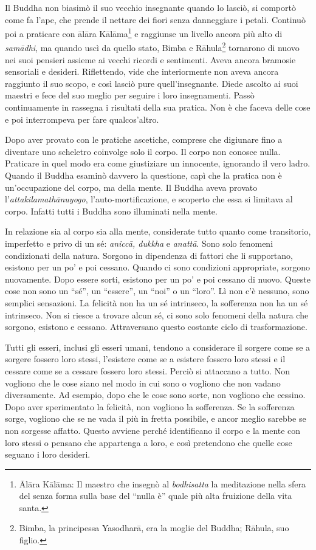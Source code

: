 Il Buddha non biasimò il suo vecchio insegnante quando lo lasciò, si
comportò come fa l'ape, che prende il nettare dei fiori senza
danneggiare i petali. Continuò poi a praticare con ālāra
Kālāma\footnote{Ālāra Kālāma: Il maestro che insegnò al
  \emph{bodhisatta} la meditazione nella sfera del senza forma sulla
  base del ``nulla è'' quale più alta fruizione della vita santa.} e
raggiunse un livello ancora più alto di \emph{samādhi}, ma quando uscì
da quello stato, Bimba e Rāhula\footnote{Bimba, la principessa
  Yasodharā, era la moglie del Buddha; Rāhula, suo figlio.} tornarono di
nuovo nei suoi pensieri assieme ai vecchi ricordi e sentimenti. Aveva
ancora bramosie sensoriali e desideri. Riflettendo, vide che
interiormente non aveva ancora raggiunto il suo scopo, e così lasciò
pure quell'insegnante. Diede ascolto ai suoi maestri e fece del suo
meglio per seguire i loro insegnamenti. Passò continuamente in rassegna
i risultati della sua pratica. Non è che faceva delle cose e poi
interrompeva per fare qualcos'altro.

Dopo aver provato con le pratiche ascetiche, comprese che digiunare fino
a diventare uno scheletro coinvolge solo il corpo. Il corpo non conosce
nulla. Praticare in quel modo era come giustiziare un innocente,
ignorando il vero ladro. Quando il Buddha esaminò davvero la questione,
capì che la pratica non è un'occupazione del corpo, ma della mente. Il
Buddha aveva provato l'\emph{attakilamathānuyogo},
l'auto-mortificazione, e scoperto che essa si limitava al corpo. Infatti
tutti i Buddha sono illuminati nella mente.

In relazione sia al corpo sia alla mente, considerate tutto quanto come
transitorio, imperfetto e privo di un sé: \emph{aniccā, dukkha} e
\emph{anattā}. Sono solo fenomeni condizionati della natura. Sorgono in
dipendenza di fattori che li supportano, esistono per un po' e poi
cessano. Quando ci sono condizioni appropriate, sorgono nuovamente. Dopo
essere sorti, esistono per un po' e poi cessano di nuovo. Queste cose
non sono un ``sé'', un ``essere'', un ``noi'' o un ``loro''. Lì non c'è
nessuno, sono semplici sensazioni. La felicità non ha un sé intrinseco,
la sofferenza non ha un sé intrinseco. Non si riesce a trovare alcun sé,
ci sono solo fenomeni della natura che sorgono, esistono e cessano.
Attraversano questo costante ciclo di trasformazione.

Tutti gli esseri, inclusi gli esseri umani, tendono a considerare il
sorgere come se a sorgere fossero loro stessi, l'esistere come se a
esistere fossero loro stessi e il cessare come se a cessare fossero loro
stessi. Perciò si attaccano a tutto. Non vogliono che le cose siano nel
modo in cui sono o vogliono che non vadano diversamente. Ad esempio,
dopo che le cose sono sorte, non vogliono che cessino. Dopo aver
sperimentato la felicità, non vogliono la sofferenza. Se la sofferenza
sorge, vogliono che se ne vada il più in fretta possibile, e ancor
meglio sarebbe se non sorgesse affatto. Questo avviene perché
identificano il corpo e la mente con loro stessi o pensano che
appartenga a loro, e così pretendono che quelle cose seguano i loro
desideri.

